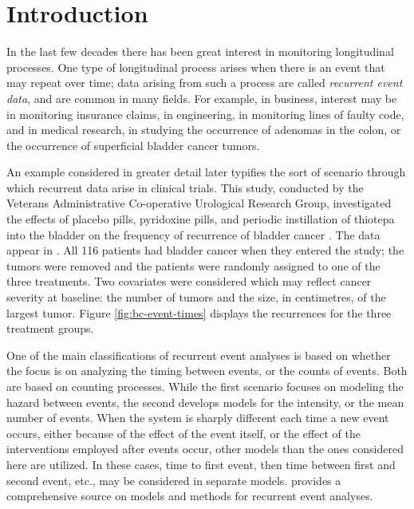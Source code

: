\documentclass[12pt]{article}
\begin{document}
\section{Introduction}\label{sec:intro}
\setcounter{section}{1}
\setcounter{page}{1}

In the last few decades there has been great interest in monitoring longitudinal processes. One type of longitudinal process arises when there is an event that may repeat over time; data arising from such a process are called {\it recurrent event data}, and are common in many fields. For example, in business, interest may be in monitoring insurance claims, in engineering, in monitoring lines of faulty code, and in medical research, in studying the occurrence of adenomas in the colon, or the occurrence of superficial bladder cancer tumors.

An example considered in greater detail later typifies the sort of scenario through which recurrent data arise in clinical trials. This study, conducted by the Veterans Administrative Co-operative Urological Research Group, investigated the effects of placebo pills, pyridoxine pills, and periodic instillation of thiotepa into the bladder on the frequency of recurrence of bladder cancer \citep{byar1977comparisons}. The data appear in \cite{andrews2000data}. All 116  patients had bladder cancer when they entered the study; the tumors  were removed and the patients were  randomly assigned to one of the three treatments. Two covariates were considered which may reflect cancer severity at baseline: the number of tumors and the size, in centimetres, of the largest tumor. Figure \ref{fig:bc-event-times} displays the recurrences for the three treatment groups.


One of the main classifications of recurrent event analyses is based on whether the focus is on analyzing the timing between events, or the counts of events. Both are based on counting processes. While the first scenario focuses on modeling the hazard between events, the second develops models for the intensity, or the mean number of events. When the system is sharply different each time a new event occurs, either because of the effect of the event itself, or the effect of the interventions employed after events occur, other models than the ones considered here are utilized. In these cases, time to first event, then time between first and second event, etc., may be considered in separate models. \cite{cook2007statistical} provides a comprehensive source on models and methods for recurrent event analyses. 
\end{document}
